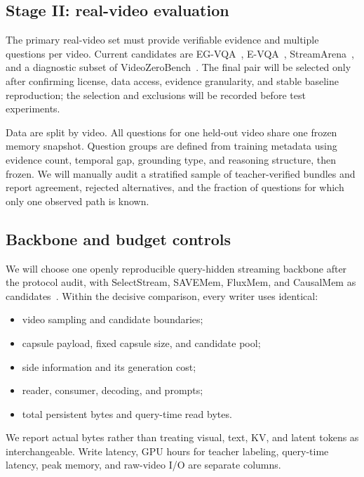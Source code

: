 \documentclass[10pt,twocolumn,letterpaper]{article}
\begin{document}
\subsection{Stage II: real-video evaluation}

The primary real-video set must provide verifiable evidence and multiple questions per video.
Current candidates are EG-VQA~\cite{huang2026egvqabenchmarkingverifiablevideo}, E-VQA~\cite{wang2026evidencebackedvideoquestionanswering}, StreamArena~\cite{zhang2026streamarenacontinuousinteractivelonghorizon}, and a diagnostic subset of VideoZeroBench~\cite{meng2026videozerobenchprobinglimitsvideo}.
The final pair will be selected only after confirming license, data access, evidence granularity, and stable baseline reproduction; the selection and exclusions will be recorded before test experiments.

Data are split by video.
All questions for one held-out video share one frozen memory snapshot.
Question groups are defined from training metadata using evidence count, temporal gap, grounding type, and reasoning structure, then frozen.
We will manually audit a stratified sample of teacher-verified bundles and report agreement, rejected alternatives, and the fraction of questions for which only one observed path is known.

\subsection{Backbone and budget controls}

We will choose one openly reproducible query-hidden streaming backbone after the protocol audit, with SelectStream, SAVEMem, FluxMem, and CausalMem as candidates~\cite{ge2026streamingvideomodelremember,wu2026semanticawareadaptivevisualmemory,xie2026fluxmemadaptivehierarchicalmemory,song2026dynamicfixedbudgetmemorybank}.
Within the decisive comparison, every writer uses identical:
\begin{itemize}[leftmargin=*,itemsep=1pt]
    \item video sampling and candidate boundaries;
    \item capsule payload, fixed capsule size, and candidate pool;
    \item side information and its generation cost;
    \item reader, consumer, decoding, and prompts;
    \item total persistent bytes and query-time read bytes.
\end{itemize}
We report actual bytes rather than treating visual, text, KV, and latent tokens as interchangeable.
Write latency, GPU hours for teacher labeling, query-time latency, peak memory, and raw-video I/O are separate columns.
\end{document}
